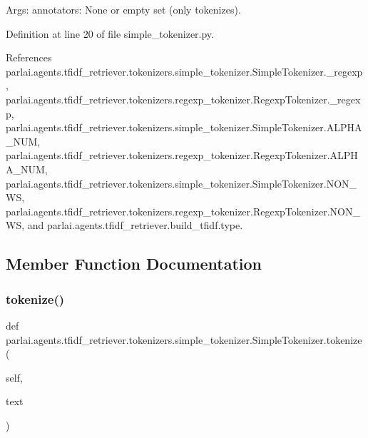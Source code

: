 \begin{DoxyVerb}Args:
    annotators: None or empty set (only tokenizes).
\end{DoxyVerb}
 

Definition at line 20 of file simple\+\_\+tokenizer.\+py.



References parlai.\+agents.\+tfidf\+\_\+retriever.\+tokenizers.\+simple\+\_\+tokenizer.\+Simple\+Tokenizer.\+\_\+regexp, parlai.\+agents.\+tfidf\+\_\+retriever.\+tokenizers.\+regexp\+\_\+tokenizer.\+Regexp\+Tokenizer.\+\_\+regexp, parlai.\+agents.\+tfidf\+\_\+retriever.\+tokenizers.\+simple\+\_\+tokenizer.\+Simple\+Tokenizer.\+A\+L\+P\+H\+A\+\_\+\+N\+UM, parlai.\+agents.\+tfidf\+\_\+retriever.\+tokenizers.\+regexp\+\_\+tokenizer.\+Regexp\+Tokenizer.\+A\+L\+P\+H\+A\+\_\+\+N\+UM, parlai.\+agents.\+tfidf\+\_\+retriever.\+tokenizers.\+simple\+\_\+tokenizer.\+Simple\+Tokenizer.\+N\+O\+N\+\_\+\+WS, parlai.\+agents.\+tfidf\+\_\+retriever.\+tokenizers.\+regexp\+\_\+tokenizer.\+Regexp\+Tokenizer.\+N\+O\+N\+\_\+\+WS, and parlai.\+agents.\+tfidf\+\_\+retriever.\+build\+\_\+tfidf.\+type.



\subsection{Member Function Documentation}
\mbox{\label{classparlai_1_1agents_1_1tfidf__retriever_1_1tokenizers_1_1simple__tokenizer_1_1SimpleTokenizer_a690bc237be6349de5c3f105e0be37ea7}} 
\subsubsection{\texorpdfstring{tokenize()}{tokenize()}}
{\footnotesize\ttfamily def parlai.\+agents.\+tfidf\+\_\+retriever.\+tokenizers.\+simple\+\_\+tokenizer.\+Simple\+Tokenizer.\+tokenize (\begin{DoxyParamCaption}\item[{}]{self,  }\item[{}]{text }\end{DoxyParamCaption})}



